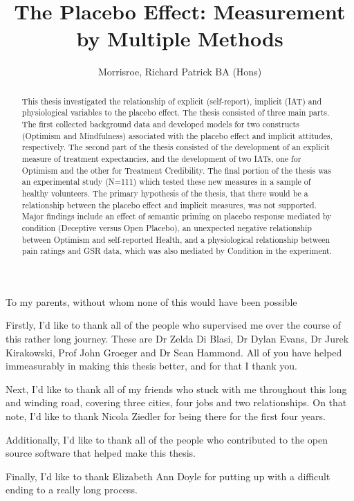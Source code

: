 \documentclass[apsych,phd,final]{uccthesis}
\title{The Placebo Effect: Measurement by Multiple Methods}
\author{Morrisroe, Richard Patrick BA (Hons)}
\begin{document}
\maketitle


\tableofcontents


\begin{dedication}
To my parents, without whom none of this would have been possible
\end{dedication}

\begin{abstract}
  This thesis investigated the relationship of explicit (self-report), implicit (IAT) and physiological variables to the placebo effect. The thesis consisted of three main parts. The first collected background data and developed models for two constructs (Optimism and Mindfulness) associated with the placebo effect and implicit attitudes, respectively. The second part of the thesis consisted of the development of an explicit measure of treatment expectancies, and the development of two IATs, one for Optimism and the other for Treatment Credibility. The final portion of the thesis was an experimental study (N=111) which tested these new measures in a sample of healthy volunteers. The primary hypothesis of the thesis, that there would be a relationship between the placebo effect and implicit measures, was not supported. Major findings include an effect of semantic priming on placebo response mediated by condition (Deceptive versus Open Placebo), an unexpected negative relationship between Optimism and self-reported Health, and a physiological relationship between pain ratings and GSR data, which was also mediated by Condition in the experiment. 
\end{abstract}

\begin{acknowledgements}
  Firstly, I'd like to thank all of the people who supervised me over the course of this rather long journey. These are Dr Zelda Di Blasi, Dr Dylan Evans, Dr Jurek Kirakowski, Prof John Groeger and Dr Sean Hammond. All of you have helped immeasurably in making this thesis better, and for that I thank you. 

Next, I'd like to thank all of my friends who stuck with me throughout this long and winding road, covering three cities, four jobs and two relationships. On that note, I'd like to thank Nicola Ziedler for being there for the first four years. 

Additionally, I'd like to thank all of the people who contributed to the open source software that helped make this thesis. 

Finally, I'd like to thank Elizabeth Ann Doyle for putting up with a difficult ending to a really long process. 
\end{acknowledgements}
\end{document}
